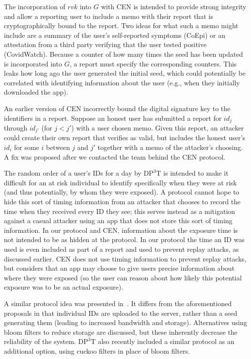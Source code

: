 \documentclass{article}
\begin{document}
The incorporation of $rvk$ into $G$ with CEN is intended to provide strong integrity and allow a reporting user to include a memo with their report that is cryptographically bound to the report. Two ideas for what such a memo might include are a summary of the user's self-reported symptoms (CoEpi) or an attestation from a third party verifying that the user tested positive (CovidWatch). Because a counter of how many times the seed has been updated is incorporated into $G$, a report must specify the corresponding counters. This leaks how long ago the user generated the initial seed, which could potentially be correlated with identifying information about the user (e.g., when they initially downloaded the app). 

An earlier version of CEN incorrectly bound the digital signature key to the identifiers in a report.
Suppose an honest user has submitted a report for $id_{j}$ through $id_{j'}$ (for $j<j'$) with a user chosen memo. 
Given this report, an attacker could create their own report that verifies as valid, but includes the honest user's $id_{i}$ for some $i$ between $j$ and $j'$ together with a memo of the attacker's choosing.
A fix was proposed after we contacted the team behind the CEN protocol.

The random order of a user's IDs for a day by $\mathrm{DP^3T}$ is intended to make it difficult for an at risk individual to identify specifically when they were at risk (and thus potentially, by whom they were exposed).
A protocol cannot hope to hide this sort of timing information from an attacker that chooses to record the time when they received every ID they see; this serves instead as a mitigation against a casual attacker using an app that does not store this sort of timing information.  
In our protocol and CEN, information about the exposure time is not intended to be as hidden at the protocol. In our protocol the time an ID was used is even included as part of a report and used to prevent replay attacks, as discussed earlier.
CEN does not use timing information to prevent replay attacks, but considers that an app may choose to give users precise information about where they were exposed (so the user can reason about how likely this potential exposure was to be an actual exposure).

A similar protocol idea was presented in~\cite{BU}. 
It differs from the aforementioned proposals in that 
individual IDs are uploaded to the server, rather than a seed generating them (leading to increased bandwidth and storage).
Alternatives using bloom filters to reduce storage are discussed, but these inherently decrease the reliability of the system. $\mathrm{DP^3T}$ also recently included a similar protocol as an additional option, using cuckoo filters in place of bloom filters.
\end{document}
